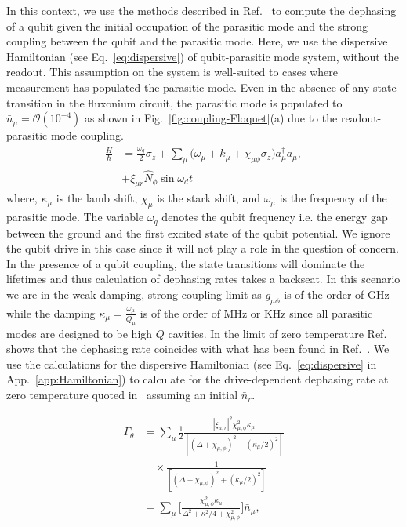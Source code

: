 \documentclass[prx,showpacs,notitlepage,twocolumn,superscriptaddress,nofootinbib,preprintnumbers,floatfix]{revtex4-2}
\begin{document}
In this context, we use the methods described in Ref.~\cite{clerk2007using} to compute the dephasing of a qubit given the initial occupation of the parasitic mode and the strong coupling between the qubit and the parasitic mode. Here, we use the dispersive Hamiltonian (see Eq.~\ref{eq:dispersive}) of qubit-parasitic mode system, without the readout. This assumption on the system is well-suited to cases where measurement has populated the parasitic mode. Even in the absence of any state transition in the fluxonium circuit, the parasitic mode is populated to $\bar n_\mu=\mathcal{O}(10^{-4})$ as shown in Fig.~\ref{fig:coupling-Floquet}(a) due to the readout-parasitic mode coupling.
\begin{align}
\frac{H}{\hbar}&=\frac{\omega_q}{2}\sigma_z+\sum_{\mu}\Big(\omega_\mu+k_\mu+\chi_{\mu\phi}\sigma_z\Big) a_\mu^\dagger a_\mu,\\
&+\xi_{\mu r}\hat N_\phi\sin{\omega_d t}
\end{align}
where, $\kappa_\mu$ is the lamb shift, $\chi_\mu$ is the stark shift, and $\omega_\mu$ is the frequency of the parasitic mode. The variable $\omega_q$ denotes the qubit frequency i.e. the energy gap between the ground and the first excited state of the qubit potential. We ignore the qubit drive in this case since it will not play a role in the question of concern. In the presence of a qubit coupling, the state transitions will dominate the lifetimes and thus calculation of dephasing rates takes a backseat. In this scenario we are in the weak damping, strong coupling limit as $g_{\mu\phi}$ is of the order of GHz while the damping $\kappa_\mu=\frac{\omega_\mu}{Q_\mu}$ is of the order of MHz or KHz since all parasitic modes are designed to be high $Q$ cavities. In the limit of zero temperature Ref.~\cite{clerk2007using} shows that the dephasing rate coincides with what has been found in Ref.~\cite{gambetta2006qubit}. We use the calculations for the dispersive Hamiltonian (see Eq.~\ref{eq:dispersive} in App.~\ref{app:Hamiltonian}) to calculate for the drive-dependent dephasing rate at zero temperature quoted in~\cite{gambetta2006qubit,clerk2007using} assuming an initial $\bar n_r$.

\begin{align}
    \Gamma_\theta&=\sum_\mu \frac{1}{2}\frac{|\xi_{\mu,r}|^2\chi_{\mu,\phi}^2\kappa_\mu}{[(\Delta+\chi_{\mu,\phi})^2+(\kappa_\mu/2)^2]}\nonumber\\
    &\quad\times\frac{1}{[(\Delta-\chi_{\mu,\phi})^2+(\kappa_\mu/2)^2]}\\
&=\sum_\mu \Big[\frac{\chi_{\mu,\phi}^2\kappa_\mu}{\Delta^2+\kappa^2/4+\chi_{\mu,\phi}^2}\Big]\bar n_\mu,\label{eq:dephasing}
\end{align}
\end{document}
